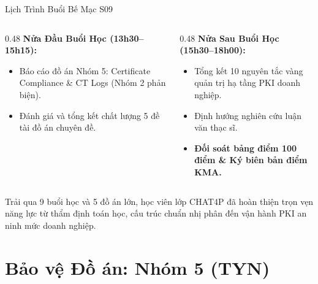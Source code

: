\begin{frame}{Lịch Trình Buổi Bế Mạc S09}
  \begin{columns}[T]
    \begin{column}{0.48\textwidth}
      \textbf{Nửa Đầu Buổi Học (13h30--15h15):}
      \begin{itemize}\small
        \item Báo cáo đồ án Nhóm 5: Certificate Compliance \& CT Logs (Nhóm 2 phản biện).
        \item Đánh giá và tổng kết chất lượng 5 đề tài đồ án chuyên đề.
      \end{itemize}
    \end{column}
    \begin{column}{0.48\textwidth}
      \textbf{Nửa Sau Buổi Học (15h30--18h00):}
      \begin{itemize}\small
        \item Tổng kết 10 nguyên tắc vàng quản trị hạ tầng PKI doanh nghiệp.
        \item Định hướng nghiên cứu luận văn thạc sĩ.
        \item \textbf{Đối soát bảng điểm 100 điểm \& Ký biên bản điểm KMA.}
      \end{itemize}
    \end{column}
  \end{columns}

  \begin{keybox}
    Trải qua 9 buổi học và 5 đồ án lớn, học viên lớp CHAT4P đã hoàn thiện trọn vẹn năng lực từ thẩm định toán học, cấu trúc chuẩn nhị phân đến vận hành PKI an ninh mức doanh nghiệp.
  \end{keybox}
\end{frame}

\section{Bảo vệ Đồ án: Nhóm 5 (TYN)}

